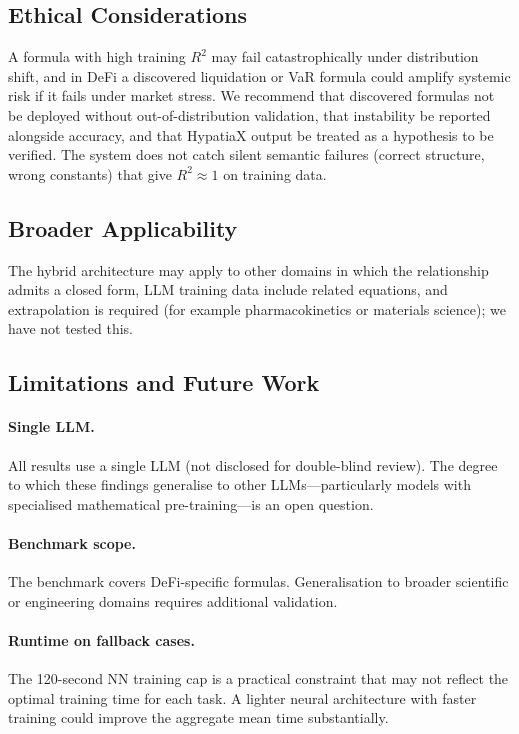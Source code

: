 \documentclass[twoside,11pt]{article}
\newcommand{\Rsq}{R^{2}}
\begin{document}
\subsection{Ethical Considerations}\label{subsec:ethical-considerations}
\label{sec:disc_ethics}

A formula with high training $\Rsq$ may fail catastrophically under distribution shift, and in DeFi a discovered liquidation or VaR formula could amplify systemic risk if it fails under market stress. We recommend that discovered formulas not be deployed without out-of-distribution validation, that instability be reported alongside accuracy, and that HypatiaX output be treated as a hypothesis to be verified. The system does not catch silent semantic failures (correct structure, wrong constants) that give $\Rsq\approx1$ on training data.

\subsection{Broader Applicability}\label{subsec:broader-applicability}
\label{sec:disc_broader}

The hybrid architecture may apply to other domains in which the relationship admits a closed form, LLM training data include related equations, and extrapolation is required (for example pharmacokinetics or materials science); we have not tested this.

\subsection{Limitations and Future Work}\label{subsec:limitations-and-future-work}
\label{sec:limitations}

\paragraph{Single LLM.}
All results use a single LLM (not disclosed for double-blind review).
The degree to which these findings generalise to other LLMs---particularly
models with specialised mathematical pre-training---is an open question.

\paragraph{Benchmark scope.}
The benchmark covers DeFi-specific formulas.  Generalisation to broader scientific
or engineering domains requires additional validation.

\paragraph{Runtime on fallback cases.}
The 120-second NN training cap is a practical constraint that may not reflect the
optimal training time for each task.  A lighter neural architecture with faster
training could improve the aggregate mean time substantially.
\end{document}
